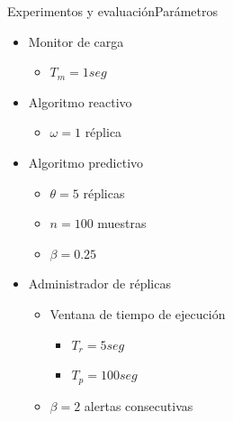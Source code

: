 
\begin{frame}{Experimentos y evaluación}{Parámetros}
\begin{itemize}
\item Monitor de carga
\begin{itemize}
	\item $T_m = 1seg$
\end{itemize}
\item Algoritmo reactivo
\begin{itemize}
	\item $\omega = 1$ réplica
\end{itemize} 
\item Algoritmo predictivo 
\begin{itemize}
	\item $\theta = 5$ réplicas
	\item $n = 100$ muestras
	\item $\beta = 0.25$
\end{itemize} 
\item Administrador de réplicas
\begin{itemize}
	\item Ventana de tiempo de ejecución
	\begin{itemize}
		\item $T_r = 5seg$
		\item $T_p = 100seg$
	\end{itemize}
	\item $\beta = 2$ alertas consecutivas
\end{itemize} 
\end{itemize}
\end{frame}


